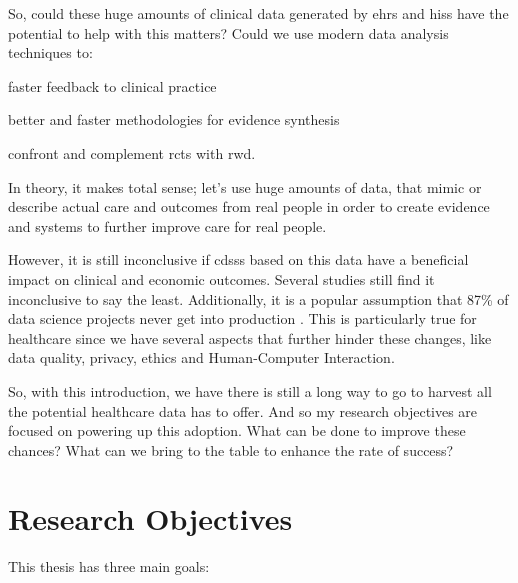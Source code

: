 So, could these huge amounts of clinical data generated by \acp{ehr} and \acp{his} have the potential to help with this matters? Could we use modern data analysis techniques to:
\begin{myitemize}
    \item faster feedback to clinical practice
    \item better and faster methodologies for evidence synthesis
    \item confront and complement \acp{rct} with \ac{rwd}.
\end{myitemize}

In theory, it makes total sense; let's use huge amounts of data, that mimic or describe actual care and outcomes from real people in order to create evidence and systems to further improve care for real people.


However, it is still inconclusive if \acp{cdss} based on this data have a beneficial impact on clinical and economic outcomes. Several studies still find it inconclusive \cite{muhiyaddinImpactClinicalDecision2020,kilsdonkFactorsInfluencingImplementation2017,muhiyaddinImpactClinicalDecision2020} to say the least.
Additionally, it is a popular assumption that 87\% of data science projects never get into production \cite{Why87Data2019}. This is particularly true for healthcare since we have several aspects that further hinder these changes, like data quality, privacy, ethics and Human-Computer Interaction.






So, with this introduction, we have there is still a long way to go to harvest all the potential healthcare data has to offer. And so my research objectives are focused on powering up this adoption. What can be done to improve these chances? What can we bring to the table to enhance the rate of success?


\section{Research Objectives}
This thesis has three main goals:



